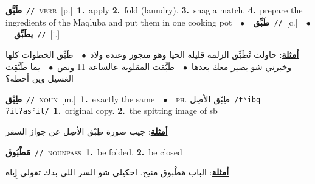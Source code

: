 \documentclass[10pt,a4paper,twoside]{article} %
\begin{document}
\begin{multicols}{2}
{\setlength\topsep{0pt}\textbf{\foreignlanguage{arabic}{طَبَّق}}\ {\color{gray}\texttt{//}\color{black}}\ \textsc{verb}\ [p.]\ \textbf{1.}~apply  \textbf{2.}~fold (laundry).  \textbf{3.}~snag a match.  \textbf{4.}~prepare the ingredients of the Maqluba and put them in one cooking pot\ \ $\bullet$\ \ \setlength\topsep{0pt}\textbf{\foreignlanguage{arabic}{طَبِّق}}\ {\color{gray}\texttt{//}\color{black}}\ [c.]\ \ $\bullet$\ \ \setlength\topsep{0pt}\textbf{\foreignlanguage{arabic}{يطَبِّق}}\ {\color{gray}\texttt{//}\color{black}}\ [i.]\  \begin{flushright}\color{gray}\foreignlanguage{arabic}{\textbf{\underline{\foreignlanguage{arabic}{أمثلة}}}: حاولت تْطَبِّق الزلمة قليلة الحيا وهو متجوز وعنده ولاد\ $\bullet$\ \  طَبِّق الخطوات كلها وخبرني شو بصير معك بعدها\ $\bullet$\ \  طَبَّقت المقلوبة عالساعة 11 ونص\ $\bullet$\ \  يما طَبَّقِت الغسيل وين أحطه؟}\end{flushright}\color{black}} \vspace{2mm}

{\setlength\topsep{0pt}\textbf{\foreignlanguage{arabic}{طِبْق}}\ {\color{gray}\texttt{//}\color{black}}\ \textsc{noun}\ [m.]\ \textbf{1.}~exactly the same\ \ $\bullet$\ \ \textsc{ph.} \color{gray} \foreignlanguage{arabic}{طِبْق الأصِل}\color{black}\ {\color{gray}\texttt{/{\sffamily tˤibq ʔilʔasˤil}/}\color{black}}\ \textbf{1.}~original copy.  \textbf{2.}~the spitting image of sb\  \begin{flushright}\color{gray}\foreignlanguage{arabic}{\textbf{\underline{\foreignlanguage{arabic}{أمثلة}}}: جيب صورة طِبْق الأصِل عن جواز السفر}\end{flushright}\color{black}} \vspace{2mm}

{\setlength\topsep{0pt}\textbf{\foreignlanguage{arabic}{مَطْبُوق}}\ {\color{gray}\texttt{//}\color{black}}\ \textsc{noun\textunderscore pass}\ \textbf{1.}~be folded.  \textbf{2.}~be closed\  \begin{flushright}\color{gray}\foreignlanguage{arabic}{\textbf{\underline{\foreignlanguage{arabic}{أمثلة}}}: الباب مَطْبوق منيح. احكيلي شو السر اللي بدك تقولي إِياه}\end{flushright}\color{black}} \vspace{2mm}


\end{multicols}
\end{document}
